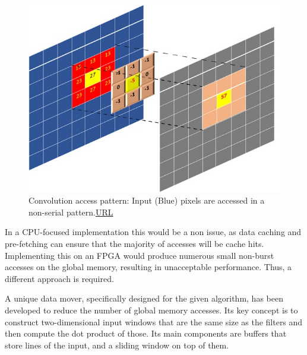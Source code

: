 \begin{figure}[H]
    \centering
        \includegraphics[width=1\textwidth]{Images/diagrams/convolution_access_pattern.jpg}
        \decoRule
        \caption[convolution access pattern]{Convolution access pattern: Input (Blue) pixels are accessed in a non-serial pattern.\href{https://github.com/Xilinx/Vitis-Tutorials/blob/2022.1/Hardware_Acceleration/Design_Tutorials/01-convolution-tutorial/lab1_app_introduction_performance_estimation.md}{URL} }
        \label{fig: convolution access pattern}
\end{figure}

In a CPU-focused implementation this would be a non issue, as data caching and pre-fetching can ensure that the majority of accesses will be cache hits. Implementing this on an FPGA would produce numerous small non-burst accesses on the global memory, resulting in unacceptable performance. Thus, a different approach is required.

A unique data mover, specifically designed for the given algorithm, has been developed to reduce the number of global memory accesses. Its key concept is to construct two-dimensional input windows that are the same size as the filters and then compute the dot product of those. Its main components are buffers that store lines of the input, and a sliding window on top of them.

